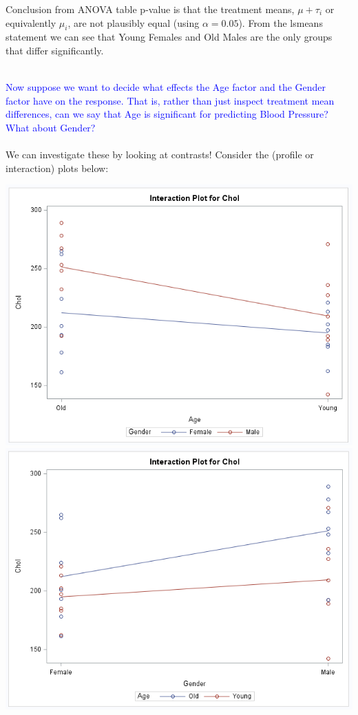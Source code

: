 Conclusion from ANOVA table p-value is that the treatment means, $\mu+\tau_i$ or equivalently $\mu_i$, are not plausibly equal (using $\alpha=0.05$).  From the lsmeans statement we can see that Young Females and Old Males are the only groups that differ significantly.\\~\\

\newpage

\textcolor{blue}{Now suppose we want to decide what effects the Age factor and the Gender factor have on the response.  That is, rather than just inspect treatment mean differences, can we say that Age is significant for predicting Blood Pressure? What about Gender?} \\~\\

We can investigate these by looking at contrasts!  Consider the (profile or interaction) plots below:
\begin{center}
\includegraphics[scale=0.55]{CholIntPlot1}\includegraphics[scale=0.55]{CholIntPlot2}
\end{center}

